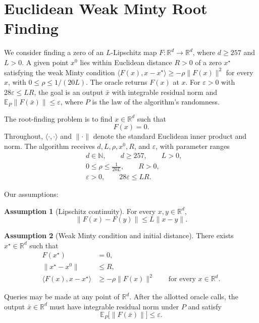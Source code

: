 \documentclass[10pt]{article}
\theoremstyle{definition}
\newtheorem{assumption}{Assumption}
\begin{document}
\section*{Euclidean Weak Minty Root Finding}
We consider finding a zero of an $L$-Lipschitz map $F:\mathbb{R}^d\to\mathbb{R}^d$, where $d\geq257$ and $L>0$. A given point $x^0$ lies within Euclidean distance $R>0$ of a zero $x^\star$ satisfying the weak Minty condition $\langle F(x),x-x^\star\rangle\geq-\rho\|F(x)\|^2$ for every $x$, with $0\leq\rho\leq1/(20L)$. The oracle returns $F(x)$ at $x$. For $\varepsilon>0$ with $28\varepsilon\leq LR$, the goal is an output $\bar{x}$ with integrable residual norm and $\mathbb{E}_{P}\|F(\bar{x})\|\leq\varepsilon$, where $P$ is the law of the algorithm's randomness.

The root-finding problem is to find $x\in\mathbb{R}^d$ such that
\[
F(x)=0.
\]
Throughout, $\langle\cdot,\cdot\rangle$ and $\|\cdot\|$ denote the standard Euclidean inner product and norm. The algorithm receives $d,L,\rho,x^0,R$, and $\varepsilon$, with parameter ranges
\[
\begin{aligned}
&d\in\mathbb{N},\qquad d\geq257,\qquad L>0,\\
&0\leq\rho\leq\frac{1}{20L},\qquad R>0,\\
&\varepsilon>0,\qquad 28\varepsilon\leq LR.
\end{aligned}
\]

Our assumptions:
\begin{assumption}[Lipschitz continuity]
For every $x,y\in\mathbb{R}^d$,
\[
\|F(x)-F(y)\|\leq L\|x-y\|.
\]
\end{assumption}

\begin{assumption}[Weak Minty condition and initial distance]
There exists $x^\star\in\mathbb{R}^d$ such that
\[
\begin{aligned}
F(x^\star)&=0,\\
\|x^\star-x^0\|&\leq R,\\
\langle F(x),x-x^\star\rangle
&\geq-\rho\|F(x)\|^2
\qquad\text{for every }x\in\mathbb{R}^d.
\end{aligned}
\]
\end{assumption}

Queries may be made at any point of $\mathbb{R}^d$. After the allotted oracle calls, the output $\bar{x}\in\mathbb{R}^d$ must have integrable residual norm under $P$ and satisfy
\[
\mathbb{E}_{P}\bigl[\|F(\bar{x})\|\bigr]\leq\varepsilon.
\]
\end{document}

